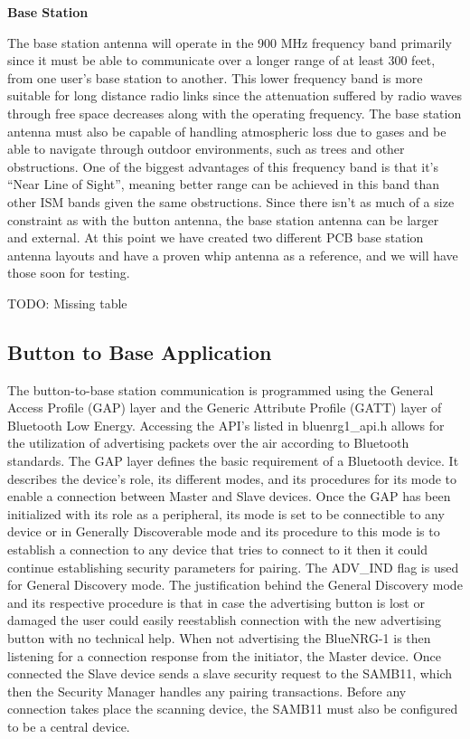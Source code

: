 \documentclass[journal,compsoc]{IEEEtran}
\begin{document}
\textbf {Base Station}

The base station antenna will operate in the 900 MHz frequency band primarily since it must be able to communicate over a longer range of at least 300 feet, from one user’s base station to another.  This lower frequency band is more suitable for long distance radio links since the attenuation suffered by radio waves through free space decreases along with the operating frequency.  The base station antenna must also be capable of handling atmospheric loss due to gases and be able to navigate through outdoor environments, such as trees and other obstructions.  One of the biggest advantages of this frequency band is that it’s “Near Line of Sight”, meaning better range can be achieved in this band than other ISM bands given the same obstructions.  Since there isn’t as much of a size constraint as with the button antenna, the base station antenna can be larger and external.  At this point we have created two different PCB base station antenna layouts and have a proven whip antenna as a reference, and we will have those soon for testing.

TODO: Missing table

\subsection{Button to Base Application}

The button-to-base station communication is programmed using the General Access Profile (GAP) layer and the Generic Attribute Profile (GATT) layer of Bluetooth Low Energy.  Accessing the API’s listed in bluenrg1\_api.h allows for the utilization of advertising packets over the air according to Bluetooth standards.  The GAP layer defines the basic requirement of a Bluetooth device.  It describes the device's role, its different modes, and its procedures for its mode to enable a connection between Master and Slave devices.  Once the GAP has been initialized with its role as a peripheral, its mode is set to be connectible to any device or in Generally Discoverable mode and its procedure to this mode is to establish a connection to any device that tries to connect to it then it could continue establishing security parameters for pairing. The ADV\_IND flag is used for General Discovery mode. The justification behind the General Discovery mode and its respective procedure is that in case the advertising button is lost or damaged the user could easily reestablish connection with the new advertising button with no technical help. When not advertising the BlueNRG-1 is then listening for a connection response from the initiator, the Master device. Once connected the Slave device sends a slave security request to the SAMB11, which then the Security Manager handles any pairing transactions. Before any connection takes place the scanning device, the SAMB11 must also be configured to be a central device.
\end{document}
